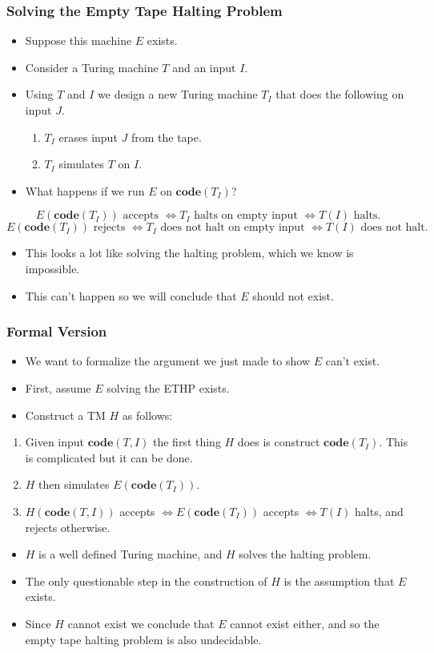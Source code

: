 \documentclass[handout]{beamer}
\newcommand{\co}{\mathbf{code}}
\begin{document}
\begin{frame}
\frametitle{Solving the Empty Tape Halting Problem}
\begin{itemize}
\item Suppose this machine $E$ exists. 
\item Consider a Turing machine $T$ and an input $I$. 
\item Using $T$ and $I$ we design a new Turing machine $T_I$ that does the following on input $J$.
\begin{enumerate}
\item $T_I$ erases input $J$ from the tape.
\item $T_I$ simulates $T$ on $I$.
\end{enumerate}

\item What happens if we run $E$ on $\co(T_I)$?
\end{itemize}
\vspace{0.2cm}
\scriptsize
\[\text{$E(\co(T_I))$ accepts $\iff T_I$ halts on empty input $\iff T(I)$ halts.}\]
\[\text{$E(\co(T_I))$ rejects $\iff T_I$ does not halt on empty input $\iff T(I)$ does not halt.}\]
\normalsize
\begin{itemize}
\item This looks a lot like solving the halting problem, which we know is impossible. 
\item This can't happen so we will conclude that $E$ should not exist.
\end{itemize}
\end{frame}

\begin{frame}
\frametitle{Formal Version}
\begin{itemize}
\item We want to formalize the argument we just made to show $E$ can't exist.
\item First, assume $E$ solving the ETHP exists.
\item Construct a TM $H$ as follows:
\end{itemize}
\begin{enumerate}
\item Given input $\co(T,I)$ the first thing $H$ does is construct $\co(T_I)$. This is complicated but it can be done.
\item $H$ then simulates $E(\co(T_I))$.
\item  $H(\co(T,I))$ accepts $\iff E(\co(T_I))$ accepts $\iff T(I)$ halts, and rejects otherwise. 
\end{enumerate}
\begin{itemize}
\item $H$ is a well defined Turing machine, and $H$ solves the halting problem. 
\item The only questionable step in the construction of $H$ is the assumption that $E$ exists. 
\item Since $H$ cannot exist we conclude that $E$ cannot exist either, and so the empty tape halting problem is also undecidable.
\end{itemize} 
\end{frame}
\end{document}
